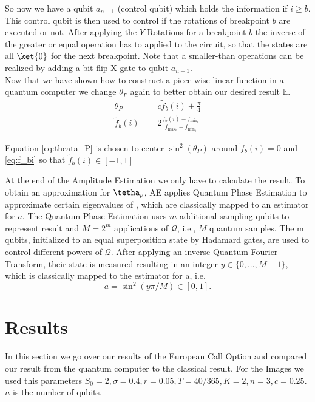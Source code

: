 \documentclass[a4paper, 12pt, one column, aas_macros]{article}
\begin{document}
So now we have a qubit $a_{n-1}$ (control qubit) which holds the information if $i\geq b$. This control qubit is then used to control if the rotations of breakpoint $b$ are executed or not. After applying the $Y$ Rotations for a breakpoint $b$ the inverse of the greater or equal operation has to applied to the circuit, so that the states are all $\ket{0}$ for the next breakpoint. 
Note that a smaller-than operations can be realized by adding a bit-flip X-gate to qubit $a_{n-1}$.
\\   

Now that we have shown how to construct a piece-wise linear function in a quantum computer we change $\theta_P$ again to better obtain our desired result $\mathbb{E}$.
\begin{align}
    \theta_P &= c\tilde{f}_b(i)+\frac{\pi}{4}\label{eq:theata_P} \\
    \tilde{f}_b(i) &= 2 \frac{f_b(i)-f_{\text{min}_b}}{f_{\text{max}_b}-f_{\text{min}_b}}\label{eq:f_bi}
\end{align}

Equation \ref{eq:theata_P} is chosen to center $ \sin^2(\theta_P) $ around $\tilde{f}_b(i) = 0$ and \ref{eq:f_bi} so that $\tilde{f}_b(i) \in [-1,1] $

At the end of the Amplitude Estimation we only have to calculate the result.
To obtain an approximation for $\tetha_p$, AE applies Quantum Phase Estimation to approximate certain eigenvalues of , which are classically mapped to an estimator for $a$. The Quantum Phase Estimation uses $m$ additional sampling qubits to represent result and $M = 2^m$ applications of $\mathcal{Q}$, i.e., $M$ quantum samples. The m qubits, initialized to an equal superposition state by Hadamard gates, are used to control different powers of $\mathcal{Q}$. After applying an inverse Quantum Fourier Transform, their state is measured resulting in an integer $y \in \{0, ..., M − 1\}$, which is classically mapped to the estimator for a, i.e.
\begin{equation}
    \tilde{a} = \sin^2(y \pi / M) \in [0,1] \label{eq:estimate_a}.
\end{equation}

\section{Results}
In this section we go over our results of the European Call Option and compared our result from the quantum computer to the classical result. For the Images we used this parameters $S_0 = 2, \sigma = 0.4, r=0.05, T=40/365, K=2, n=3, c=0.25$. $n$ is the number of qubits.
\end{document}
